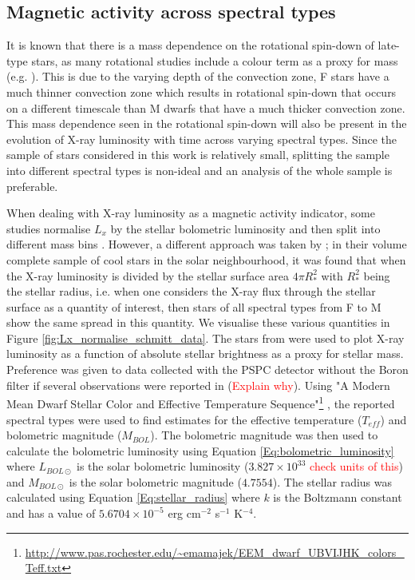 \subsection{Magnetic activity across spectral types}
It is known that there is a mass dependence on the rotational spin-down of late-type stars, as many rotational studies include a colour term as a proxy for mass (e.g. \citealt{Barnes_2003,Barnes_2010,Angus_etal_2015}). This is due to the varying depth of the convection zone, F stars have a much thinner convection zone which results in rotational spin-down that occurs on a different timescale than M dwarfs that have a much thicker convection zone. This mass dependence seen in the rotational spin-down will also be present in the evolution of X-ray luminosity with time across varying spectral types. Since the sample of stars considered in this work is relatively small, splitting the sample into different spectral types is non-ideal and an analysis of the whole sample is preferable.

When dealing with X-ray luminosity as a magnetic activity indicator, some studies normalise $L_{x}$ by the stellar bolometric luminosity and then split into different mass bins \citep{Preibisch_Feigelson_2005,Jackson_etal_2012}. However, a different approach was taken by \citet{Schmitt_Liefke_2004}; in their volume complete sample of cool stars in the solar neighbourhood, it was found that when the X-ray luminosity is divided by the stellar surface area $4\pi R_{*}^{2}$ with $R_{*}^{2}$ being the stellar radius, i.e. when one considers the X-ray flux through the stellar surface as a quantity of interest, then stars of all spectral types from F to M show the same spread in this quantity. We visualise these various quantities in Figure \ref{fig:Lx_normalise_schmitt_data}. The stars from \citet{Schmitt_Liefke_2004} were used to plot X-ray luminosity as a function of absolute stellar brightness as a proxy for stellar mass. Preference was given to data collected with the PSPC detector without the Boron filter if several observations were reported in \citet{Schmitt_Liefke_2004}(\textcolor{red}{Explain why}). Using "A Modern Mean Dwarf Stellar Color and Effective Temperature Sequence"\footnote{\url{http://www.pas.rochester.edu/~emamajek/EEM_dwarf_UBVIJHK_colors_Teff.txt}} \citep{Pecaut_Mamajek_2013}, the reported spectral types \citep{Schmitt_Liefke_2004} were used to find estimates for the effective temperature ($T_{eff}$) and bolometric magnitude ($M_{BOL}$). The bolometric magnitude was then used to calculate the bolometric luminosity using Equation \ref{Eq:bolometric_luminosity} where $L_{BOL\odot}$ is the solar bolometric luminosity ($3.827 \times 10^{33}$ \textcolor{red}{check units of this}) and $M_{BOL\odot}$ is the solar bolometric magnitude ($4.7554$). The stellar radius was calculated using Equation \ref{Eq:stellar_radius} where $k$ is the Boltzmann constant and has a value of $5.6704 \times 10^{-5}$ erg cm$^{-2}$ s$^{-1}$ K$^{-4}$. 


